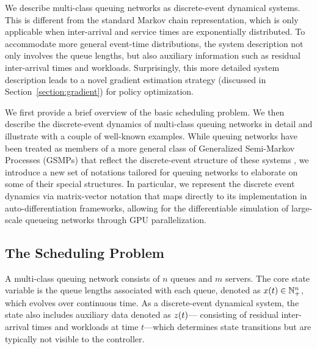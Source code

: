 
We describe multi-class queuing networks as discrete-event dynamical systems. This is different from the standard Markov chain representation, which is only applicable when inter-arrival and service times are exponentially distributed.
To accommodate more general event-time distributions, the system description not only involves the queue lengths, but also auxiliary information such as residual inter-arrival times and workloads. Surprisingly, this more detailed system description leads to a novel gradient estimation strategy (discussed in Section~\ref{section:gradient}) for policy optimization.

We first provide a brief overview of the basic scheduling problem. We then describe the discrete-event dynamics of multi-class queuing networks in detail and illustrate with a couple of well-known examples. While queuing networks have been treated as members of a more general class of Generalized Semi-Markov Processes (GSMPs) that reflect the discrete-event structure of these systems \cite{glynn1989gsmp}, we introduce a new set of notations tailored for queuing networks to elaborate on some of their special structures.
In particular, we represent the discrete event dynamics 
via matrix-vector notation that maps directly to its implementation in auto-differentiation frameworks, allowing for the differentiable simulation of large-scale queueing networks through GPU parallelization. 

\subsection{\label{subsec:control} The Scheduling Problem}

A multi-class queuing network consists of $n$ queues and $m$ servers. The core state variable is the queue lengths associated with each queue, denoted as  $x(t) \in \mathbb{N}_{+}^{n}$, which evolves over continuous time. As a discrete-event dynamical system, the state also includes auxiliary data denoted as $z(t)$--- consisting of residual inter-arrival times and workloads at time $t$---which determines state transitions but are typically not visible to the controller.

